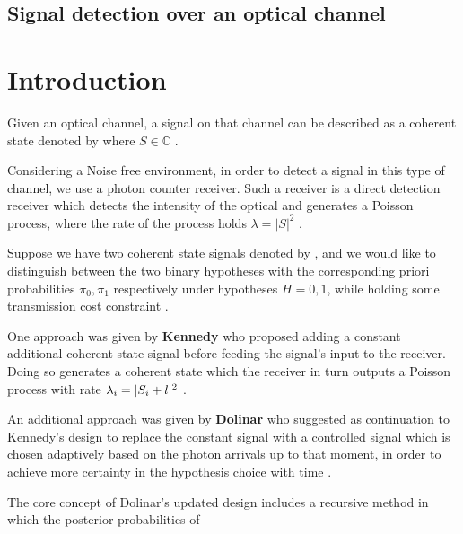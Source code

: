 \documentclass[12pt]{article}
\newcommand{\lambdaWave}{\overline{\lambda}}
\newcommand{\lambdaSwitch}[1]{%
		\IfEqCase{#1}{%
			{0}{\lambda_0=|S_0+l|^2}%
			{1}{\lambda_1=|S_1+l|^2}%
			{i}{\lambda_i=|S_i+l|^2}%
			{~}{\widetilde{\lambda}=\pi_{0}\sqrt{\lambda_{0}}+\pi_{1}\sqrt{\lambda_{1}}}%
			{-}{\lambdaWave=\pi_{0}\lambda_{0}+\pi_{1}\lambda_{1}}%
		}[\PackageError{tree}{Undefined option to tree: #1}{}]%
	}%
\begin{document}
	\begin{center}
	    \sectionfont{\LARGE\selectfont}
		\section*{Signal detection over an optical channel}
	\end{center}
	\vspace{0.3cm}

\sectionfont{\Large\selectfont}

\section{Introduction}

	Given an optical channel, a signal on that channel can be described as a coherent state denoted by  where  $S\in\mathbb{C}$
.\\\par
	Considering a Noise free environment, in order to detect a signal in this type of channel, 
	we use a photon counter receiver. Such a receiver is a direct detection receiver which detects 
	the intensity of the optical and generates a Poisson process, where the rate of the process holds $\lambda = |S|^2$ 
.\\\par
	Suppose we have two coherent state signals denoted by ,  and we would like to distinguish between the two 
	binary hypotheses with the corresponding priori probabilities $\pi_0, \pi_1$ respectively under hypotheses $H=0,1$, 
	while holding some transmission cost constraint
.\\\par
	One approach was given by \textbf{Kennedy} who proposed adding a constant additional coherent state signal 
	before feeding the signal’s input to the receiver. Doing so generates a coherent state  which 
	the receiver in turn outputs a Poisson process with rate $\lambdaSwitch{i}$
.\\\par
	An additional approach was given by \textbf{Dolinar} who suggested as continuation to Kennedy’s design to replace the constant 
	signal with a controlled signal  which is chosen adaptively based on the photon arrivals up to that moment, 
	in order to achieve more certainty in the hypothesis choice with time
.\\\par
	The core concept of Dolinar’s updated design includes a recursive method in which the posterior probabilities of 
\end{document}
